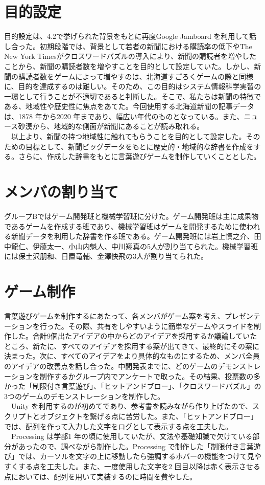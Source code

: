 \section{目的設定}
目的設定は、4.2で挙げられた背景をもとに再度Google Jamboard を利用して話し合った。初期段階では、背景として若者の新聞における購読率の低下やThe New York Timesがクロスワードパズルの導入により、新聞の購読者を増やしたことから、新聞の購読者数を増やすことを目的として設定していた。しかし、新聞の購読者数をゲームによって増やすのは、北海道すごろくゲームの際と同様に、目的を達成するのは難しい。そのため、この目的はシステム情報科学実習の一環として行うことが不適切であると判断した。そこで、私たちは新聞の特徴である、地域性や歴史性に焦点をあてた。今回使用する北海道新聞の記事データは、1878 年から2020 年まであり、幅広い年代のものとなっている。また、ニュース砂漠から、地域的な側面が新聞にあることが読み取れる。\\
　以上より、新聞の持つ地域性に触れてもらうことを目的として設定した。そのための目標として、新聞ビッグデータをもとに歴史的・地域的な辞書を作成をする。さらに、作成した辞書をもとに言葉遊びゲームを制作していくこととした。

\section{メンバの割り当て}
グループBではゲーム開発班と機械学習班に分けた。ゲーム開発班は主に成果物であるゲームを作成する班であり、機械学習班はゲームを開発するために使われる新聞データを利用した辞書を作る班である。ゲーム開発班には岩上慎之介、田中龍仁、伊藤太一、小山内魁人、中川翔真の5人が割り当てられた。機械学習班には保土沢朋和、日置竜輔、金澤快飛の3人が割り当てられた。

\section{ゲーム制作}
言葉遊びゲームを制作するにあたって、各メンバがゲーム案を考え、プレゼンテーションを行った。その際、共有をしやすいように簡単なゲームやスライドを制作した。合計9個出たアイデアの中からどのアイデアを採用するか議論していたところ、新たに、すべてのアイデアを採用する案が出てきて、最終的にその案に決まった。次に、すべてのアイデアをより具体的なものにするため、メンバ全員のアイデアの改善点を話し合った。中間発表までに、どのゲームのデモンストレーションを制作するかグループ内でアンケートで取った。その結果、投票数の多かった「制限付き言葉遊び」、「ヒットアンドブロー」、「クロスワードパズル」の3つのゲームのデモンストレーションを制作した。\\
　Unity を利用するのが初めてであり、参考書を読みながら作り上げたので、スクリプトとオブジェクトを繋げる点に苦労した。また、「ヒットアンドブロー」では、配列を作って入力した文字をログとして表示する点を工夫した。\\
　Processing は学部1 年の頃に使用していたが、文法や基礎知識で欠けている部分があったので、調べながら制作した。Processing で制作した「制限付き言葉遊び」では、カーソルを文字の上に移動したら強調するホバーの機能をつけて見やすくする点を工夫した。また、一度使用した文字を2 回目以降は赤く表示させる点においては、配列を用いて実装するのに時間を費やした。

